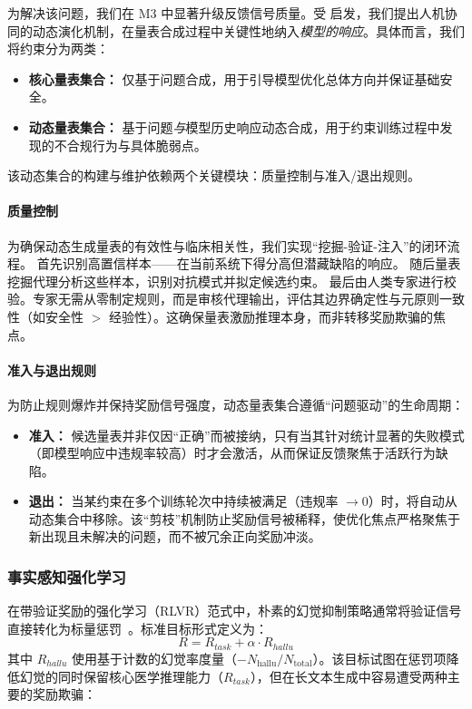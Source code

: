 为解决该问题，我们在 M3 中显著升级反馈信号质量。受 \cite{DBLP:journals/corr/abs-2511-19399,DBLP:journals/corr/abs-2509-21500} 启发，我们提出人机协同的动态演化机制，在量表合成过程中关键性地纳入\textit{模型的响应}。具体而言，我们将约束分为两类：

\begin{itemize}
    \item \textbf{核心量表集合：} 仅基于问题合成，用于引导模型优化总体方向并保证基础安全。
    \item \textbf{动态量表集合：} 基于问题\textit{与}模型历史响应动态合成，用于约束训练过程中发现的不合规行为与具体脆弱点。
\end{itemize}
该动态集合的构建与维护依赖两个关键模块：质量控制与准入/退出规则。

\paragraph{质量控制}
为确保动态生成量表的有效性与临床相关性，我们实现“挖掘-验证-注入”的闭环流程。
首先识别高置信样本——在当前系统下得分高但潜藏缺陷的响应。
随后量表挖掘代理分析这些样本，识别对抗模式并拟定候选约束。
最后由人类专家进行校验。专家无需从零制定规则，而是审核代理输出，评估其边界确定性与元原则一致性（如安全性 $>$ 经验性）。这确保量表激励推理本身，而非转移奖励欺骗的焦点。

\paragraph{准入与退出规则}
为防止规则爆炸并保持奖励信号强度，动态量表集合遵循“问题驱动”的生命周期：

\begin{itemize}
    \item \textbf{准入：} 候选量表并非仅因“正确”而被接纳，只有当其针对统计显著的失败模式（即模型响应中违规率较高）时才会激活，从而保证反馈聚焦于活跃行为缺陷。
    \item \textbf{退出：} 当某约束在多个训练轮次中持续被满足（违规率 $\rightarrow 0$）时，将自动从动态集合中移除。该“剪枝”机制防止奖励信号被稀释，使优化焦点严格聚焦于新出现且未解决的问题，而不被冗余正向奖励冲淡。
\end{itemize}


\subsubsection{事实感知强化学习}
\label{sec:fact-aware}

在带验证奖励的强化学习（RLVR）范式中，朴素的幻觉抑制策略通常将验证信号直接转化为标量惩罚~\cite{DBLP:conf/emnlp/MinKLLYKIZH23, chen2025learning}。标准目标形式定义为：
\begin{equation}
R = R_{task} + \alpha \cdot R_{hallu}
\label{eq:naive-objective}
\end{equation}
其中 $R_{hallu}$ 使用基于计数的幻觉率度量（$-N_{\text{hallu}}/N_{\text{total}}$）。该目标试图在惩罚项降低幻觉的同时保留核心医学推理能力（$R_{task}$），但在长文本生成中容易遭受两种主要的奖励欺骗：

